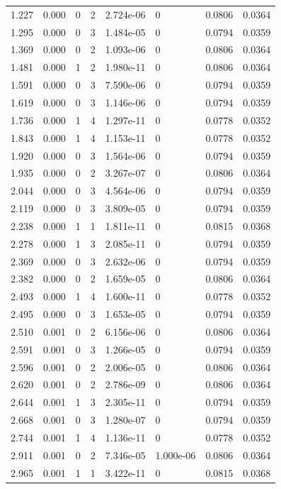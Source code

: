 \documentclass[preview]{standalone}
\begin{document}
{{\begin{tabular}{L{1.2cm}C{1.2cm} C{0.3cm}C{0.5cm} C{1.4cm}C{1.4cm} C{1.4cm}C{1.4cm}}
  1.227  &  0.000  & 0     &  2 &  2.724e-06  & 0  & 0.0806 &  0.0364   \\ 
  1.295  &  0.000  & 0     &  3 &  1.484e-05  & 0  & 0.0794 &  0.0359   \\ 
  1.369  &  0.000  & 0     &  2 &  1.093e-06  & 0  & 0.0806 &  0.0364   \\ 
  1.481  &  0.000  & 1     &  2 &  1.980e-11  & 0  & 0.0806 &  0.0364   \\ 
  1.591  &  0.000  & 0     &  3 &  7.590e-06  & 0  & 0.0794 &  0.0359   \\ 
  1.619  &  0.000  & 0     &  3 &  1.146e-06  & 0  & 0.0794 &  0.0359   \\ 
  1.736  &  0.000  & 1     &  4 &  1.297e-11  & 0  & 0.0778 &  0.0352   \\ 
  1.843  &  0.000  & 1     &  4 &  1.153e-11  & 0  & 0.0778 &  0.0352   \\ 
  1.920  &  0.000  & 0     &  3 &  1.564e-06  & 0  & 0.0794 &  0.0359   \\ 
  1.935  &  0.000  & 0     &  2 &  3.267e-07  & 0  & 0.0806 &  0.0364   \\ 
  2.044  &  0.000  & 0     &  3 &  4.564e-06  & 0  & 0.0794 &  0.0359   \\ 
  2.119  &  0.000  & 0     &  3 &  3.809e-05  & 0  & 0.0794 &  0.0359   \\ 
  2.238  &  0.000  & 1     &  1 &  1.811e-11  & 0  & 0.0815 &  0.0368   \\ 
  2.278  &  0.000  & 1     &  3 &  2.085e-11  & 0  & 0.0794 &  0.0359   \\ 
  2.369  &  0.000  & 0     &  3 &  2.632e-06  & 0  & 0.0794 &  0.0359   \\ 
  2.382  &  0.000  & 0     &  2 &  1.659e-05  & 0  & 0.0806 &  0.0364   \\ 
  2.493  &  0.000  & 1     &  4 &  1.600e-11  & 0  & 0.0778 &  0.0352   \\ 
  2.495  &  0.000  & 0     &  3 &  1.653e-05  & 0  & 0.0794 &  0.0359   \\ 
  2.510  &  0.001  & 0     &  2 &  6.156e-06  & 0  & 0.0806 &  0.0364   \\ 
  2.591  &  0.001  & 0     &  3 &  1.266e-05  & 0  & 0.0794 &  0.0359   \\ 
  2.596  &  0.001  & 0     &  2 &  2.006e-05  & 0  & 0.0806 &  0.0364   \\ 
  2.620  &  0.001  & 0     &  2 &  2.786e-09  & 0  & 0.0806 &  0.0364   \\ 
  2.644  &  0.001  & 1     &  3 &  2.305e-11  & 0  & 0.0794 &  0.0359   \\ 
  2.668  &  0.001  & 0     &  3 &  1.280e-07  & 0  & 0.0794 &  0.0359   \\ 
  2.744  &  0.001  & 1     &  4 &  1.136e-11  & 0  & 0.0778 &  0.0352   \\ 
  2.911  &  0.001  & 0     &  2 &  7.346e-05  & 1.000e-06  & 0.0806 &  0.0364   \\ 
  2.965  &  0.001  & 1     &  1 &  3.422e-11  & 0  & 0.0815 &  0.0368   \\ 
\hline 
\end{tabular} 

}}
\end{document}
